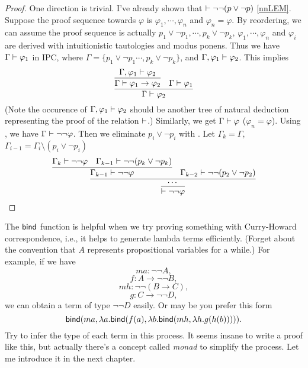 \begin{proof}
    One direction is trivial. 
    I've already shown that $\vdash \neg\neg(p\vee\neg p)$ 
    \eqref{nnLEM}.
    Suppose the proof sequence towards $\varphi$ is $\varphi_1,\cdots,
    \varphi_n$ and $\varphi_n=\varphi$. By reordering, we can assume
    the proof sequence is actually $p_1\vee\neg p_1,\cdots, 
    p_k\vee\neg p_k$, $\varphi_1,\cdots,\varphi_n$ and $\varphi_i$ are
    derived with intuitionistic tautologies and modus ponens. Thus
    we have $\Gamma\vdash \varphi_1$ in IPC, where 
    $\Gamma=\{p_1\vee\neg p_1\cdots,p_k\vee\neg p_k\}$,
    and $\Gamma,\varphi_1\vdash\varphi_2$. This implies
    $$
        \infer{\Gamma\proves\varphi_2}{
            \infer{\Gamma\proves\varphi_1\to\varphi_2}{
                \Gamma,\varphi_1\proves\varphi_2
            }
            &
            \Gamma\proves\varphi_1
        }
    $$
    (Note the occurence of $\Gamma,\varphi_1\vdash\varphi_2$ should be
    another tree of natural deduction representing the proof of the 
    relation $\vdash$.)
    Similarly, we get $\Gamma\vdash \varphi$ ($\varphi_n=\varphi$).
    Using , we have $\Gamma\vdash\neg\neg\varphi$.
    Then we eliminate $p_i\vee\neg p_i$ with .
    Let $\Gamma_k=\Gamma$, $\Gamma_{i-1}=\Gamma_i\setminus(p_i\vee\neg p_i)$
    $$
        \infer{\proves \neg\neg\varphi}{\infer{\cdots}{
            \infer{\Gamma_{k-1}\proves \neg\neg\varphi}{
                \Gamma_k\proves \neg\neg\varphi
                &
                \Gamma_{k-1}\proves \neg\neg(p_k\vee\neg p_k)
            }
            &
            \Gamma_{k-2}\proves \neg\neg(p_2\vee\neg p_2)
        }}
    $$
\end{proof}

\begin{remark}
    The $\text{\sf bind}$ function is helpful when we try proving something
    with Curry-Howard correspondence, i.e., it helps to generate
    lambda terms efficiently. (Forget about the convention that $A$ 
    represents propositional variables for a while.)
    For example, if we have
    $$ma:\neg\neg A,$$
    $$f: A\to\neg\neg B,$$
    $$mh:\neg\neg(B\to C),$$
    $$g: C\to\neg\neg D,$$
    we can obtain a term of type $\neg\neg D$ easily.
    Or may be you prefer this form
    \begin{equation}
        \text{\sf bind}(ma,\lambda a.\text{\sf bind}(f(a),\lambda b.\text{\sf bind}(mh,\lambda h.g(h(b))))).
    \end{equation}
    Try to infer the type of each term in this process. 
    It seems insane to write a proof like this, but actually there's a
    concept called {\it monad} to simplify the process. Let me introduce
    it in the next chapter. 
\end{remark}
